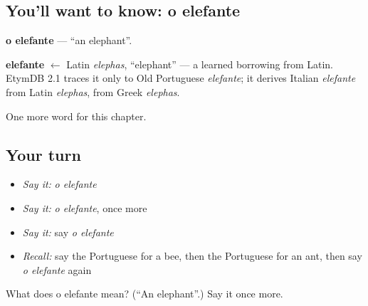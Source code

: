 \subsection*{You'll want to know: o elefante}
\textbf{o elefante} — \textquotedblleft{}an elephant\textquotedblright{}.

\begin{cousinweb}
\textbf{elefante} $\leftarrow$ Latin \emph{elephas}, \textquotedblleft{}elephant\textquotedblright{} — a learned borrowing from Latin. EtymDB 2.1 traces it only to Old Portuguese \emph{elefante}; it derives Italian \emph{elefante} from Latin \emph{elephas}, from Greek \emph{elephas}.
\end{cousinweb}

\begin{grammarlens}[title={What you've built}]
One more word for this chapter.
\end{grammarlens}

\subsection*{Your turn}
\begin{itemize}
\raggedright
  \item \emph{Say it:} \emph{o elefante}
  \item \emph{Say it:} \emph{o elefante}, once more
  \item \emph{Say it:} say \emph{o elefante}
  \item \emph{Recall:} say the Portuguese for a bee, then the Portuguese for an ant, then say \emph{o elefante} again
\end{itemize}

\begin{tcolorbox}[breakable,colback=teal!4,colframe=teal!35!black,title={Before you move on}]
What does o elefante mean? (\textquotedblleft{}An elephant\textquotedblright{}.) Say it once more.
\end{tcolorbox}

